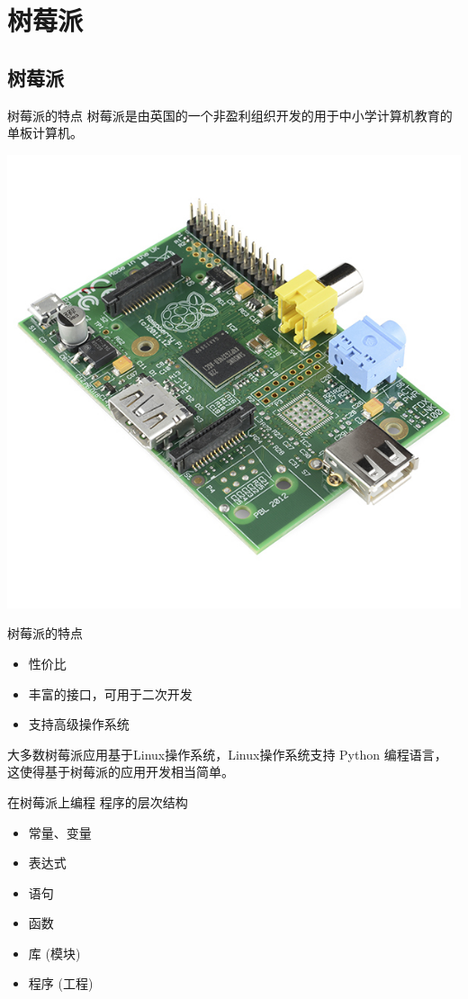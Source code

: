 \documentclass[14pt,t]{beamer}
\begin{document}
\section{树莓派}
\subsection{树莓派}

\begin{frame}{树莓派的特点}
    树莓派是由英国的一个非盈利组织开发的用于中小学计算机教育的
    单板计算机。

    \begin{center}
        \includegraphics[width=.3\textwidth]{Pi1_A.jpg}
    \end{center}
\end{frame}

\begin{frame}{树莓派的特点}
\begin{itemize}
    \item 性价比
    \item 丰富的接口，可用于二次开发
    \item 支持高级操作系统
\end{itemize}
大多数树莓派应用基于Linux操作系统，Linux操作系统支持 Python 编程语言，
这使得基于树莓派的应用开发相当简单。
\end{frame}

\begin{frame}{在树莓派上编程}
    程序的层次结构
\begin{itemize}
    \item 常量、变量
    \item 表达式
    \item 语句
    \item 函数
    \item 库 (模块)
    \item 程序 (工程)
\end{itemize}
\end{frame}
\end{document}
